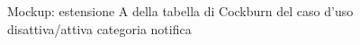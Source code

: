 \begin{figure}[ht]
    \caption{Mockup: estensione A della tabella di Cockburn del caso d'uso disattiva/attiva categoria notifica}
    \label{fig:mockup_estensione_A_disattiva_notifiche}
\end{figure}

\newpage

